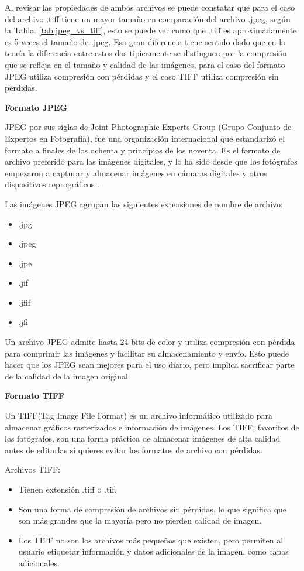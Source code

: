 \documentclass[conference,onecolumn,12pt]{IEEEtran}
\numberwithin{equation}{subsection}
\begin{document}
Al revisar las propiedades de ambos  archivos se puede constatar que para el caso del archivo .tiff tiene un mayor tamaño en comparación del archivo .jpeg, según la Tabla. \ref{tab:jpeg_vs_tiff}, esto se puede ver como que .tiff es aproximadamente es 5 veces el tamaño de .jpeg. Esa gran diferencia tiene sentido dado que en la teoría la diferencia entre estos dos tipicamente se distinguen por la compresión que se refleja en el tamaño y calidad de las imágenes, para el caso del formato JPEG utiliza compresión con pérdidas y el caso TIFF utiliza compresión sin pérdidas.


\textbf{Formato JPEG}

JPEG por sus siglas de Joint Photographic Experts Group (Grupo Conjunto de Expertos en Fotografía), fue una organización internacional que estandarizó el formato a finales de los ochenta y principios de los noventa. Es el formato de archivo preferido para las imágenes digitales, y lo ha sido desde que los fotógrafos empezaron a capturar y almacenar imágenes en cámaras digitales y otros dispositivos reprográficos \cite{jpeg}.

Las imágenes JPEG agrupan las siguientes extensiones de nombre de archivo:

\begin{itemize}
\item .jpg
\item .jpeg
\item .jpe
\item .jif
\item .jfif
\item .jfi
\end{itemize}


Un archivo JPEG admite hasta 24 bits de color y utiliza compresión con pérdida para comprimir las imágenes y facilitar su almacenamiento y envío. Esto puede hacer que los JPEG sean mejores para el uso diario, pero implica sacrificar parte de la calidad de la imagen original.


\textbf{Formato TIFF}

Un TIFF(Tag Image File Format) es un archivo informático utilizado para almacenar gráficos rasterizados e información de imágenes. Los TIFF, favoritos de los fotógrafos, son una forma práctica de almacenar imágenes de alta calidad antes de editarlas si quieres evitar los formatos de archivo con pérdidas\cite{tiff}.

Archivos TIFF:
\begin{itemize}
\item Tienen extensión .tiff o .tif.
\item Son una forma de compresión de archivos sin pérdidas, lo que significa que son más grandes que la mayoría pero no pierden calidad de imagen.
\item Los TIFF no son los archivos más pequeños que existen, pero permiten al usuario etiquetar información y datos adicionales de la imagen, como capas adicionales.
\end{itemize}
\end{document}
